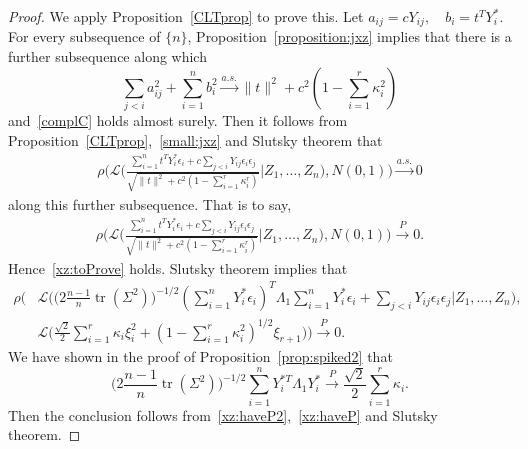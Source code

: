 \documentclass[3p]{elsarticle}
\DeclareMathOperator{\mytr}{tr}
\theoremstyle{plain}
\theoremstyle{definition}
\theoremstyle{remark}
\begin{document}
\begin{proof}
We apply Proposition~\ref{CLTprop} to prove this.
Let
$
    a_{ij}=cY_{ij},
    \quad
    b_i=t^T Y_i^*
$.
    For every subsequence of $\{n\}$, Proposition~\ref{proposition:jxz} implies that there is a further subsequence along which
    \begin{equation}\label{small:jxz}
    \sum_{j<i} a_{ij}^2+\sum_{i=1}^n b_i^2\xrightarrow{a.s.} \|t\|^2+c^2(1-\sum_{i=1}^r \kappa_i^2)
    \end{equation}
    and~\eqref{complC} holds almost surely.
    Then it follows from Proposition~\ref{CLTprop},~\eqref{small:jxz} and Slutsky theorem that
    \begin{equation*}
        \begin{aligned}
            \rho\Big(\mathcal{L}\Big( \frac{\sum_{i=1}^n t^T Y_i^* \epsilon_i+c\sum_{j<i} Y_{ij} \epsilon_i \epsilon_j}{\sqrt{\|t\|^2+c^2(1-\sum_{i=1}^r \kappa_i^r)}} \Big| Z_1,\ldots,Z_n\Big)
            ,
            N (0,1)\Big)\xrightarrow{a.s.} 0
        \end{aligned}
    \end{equation*}
    along this further subsequence.
    That is to say,
    \begin{equation*}
        \begin{aligned}
            \rho\Big(\mathcal{L}\Big( \frac{\sum_{i=1}^n t^T Y_i^* \epsilon_i+c\sum_{j<i} Y_{ij} \epsilon_i \epsilon_j}{\sqrt{\|t\|^2+c^2(1-\sum_{i=1}^r \kappa_i^r)}} \Big| Z_1,\ldots,Z_n\Big)
            ,
            N (0,1)\Big)\xrightarrow{P} 0.
        \end{aligned}
    \end{equation*}
    Hence~\eqref{xz:toProve} holds.
    Slutsky theorem implies that
    \begin{equation}\label{xz:haveP}
    \begin{aligned}
        \rho\Big(&
        \mathcal{L}\big(
        \big(2\frac{n-1}{n}\mytr(\Sigma^2)\big)^{-1/2}(\sum_{i=1}^n  Y_i^* \epsilon_i)^T \Lambda_1 \sum_{i=1}^n  Y_i^* \epsilon_i
        +
        \sum_{j<i} Y_{ij} \epsilon_i \epsilon_j
        |Z_1,\ldots,Z_n\big)
        ,\\
        &\mathcal{L}\big(\frac{\sqrt{2}}{2}\sum_{i=1}^r \kappa_i \xi_i^2 + (1-\sum_{i=1}^r \kappa_i^2)^{1/2}\xi_{r+1}\big)\Big)
        \xrightarrow{P}0.
    \end{aligned}
    \end{equation}
    We have shown in the proof of Proposition~\ref{prop:spiked2} that
        \begin{equation}\label{xz:haveP2}
        \big(2\frac{n-1}{n}\mytr(\Sigma^2)\big)^{-1/2}
        \sum_{i=1}^n Y_i^{*T}\Lambda_1 Y_i^*
      \xrightarrow{P}\frac{\sqrt{2}}{2}\sum_{i=1}^r \kappa_i.
        \end{equation}
        Then the conclusion follows from~\eqref{xz:haveP2},~\eqref{xz:haveP} and Slutsky theorem.
        

\end{proof}
\end{document}
